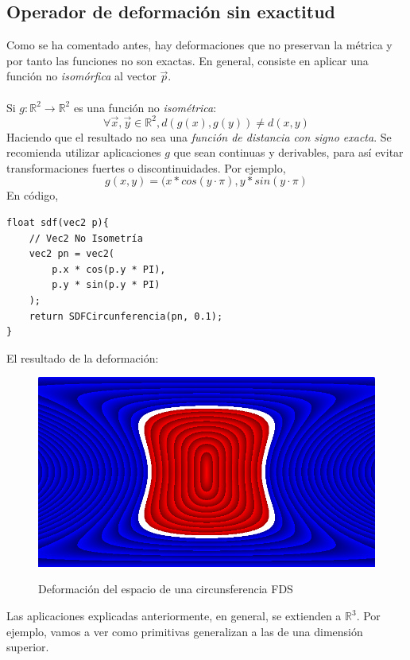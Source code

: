 \subsection{Operador de deformación sin exactitud}
Como se ha comentado antes, hay deformaciones que no preservan la métrica y por tanto las funciones no son exactas. En general, consiste en aplicar una función no \textit{isomórfica} al vector \(\Vec{p}\).\\\\
Si \(g:\mathbb{R}^2\longrightarrow \mathbb{R}^2\) es una función no \textit{isométrica}:
\[ \forall \Vec{x}, \Vec{y} \in \mathbb{R}^2, d(g(x), g(y)) \neq d(x,y) \]
Haciendo que el resultado no sea una \textit{función de distancia con signo exacta}. Se recomienda utilizar aplicaciones \(g\) que sean continuas y derivables, para así evitar transformaciones fuertes o discontinuidades. Por ejemplo,
\[g(x,y)=(x * cos(y \cdot \pi), y * sin(y \cdot \pi)\]
En código,
\begin{lstlisting}
float sdf(vec2 p){
	// Vec2 No Isometría
	vec2 pn = vec2(
	    p.x * cos(p.y * PI),
	    p.y * sin(p.y * PI)
	);
	return SDFCircunferencia(pn, 0.1);
}
\end{lstlisting}
El resultado de la deformación:
\begin{figure}[H]
  \centering
  \captionsetup{justification=centering}%
  \includegraphics[width=1.0\textwidth]{secciones/imagenes/sdf/2d/sdf_deform.png}\label{fig:deform}
  \caption{Deformación del espacio de una circunsferencia FDS}
\end{figure}

Las aplicaciones explicadas anteriormente, en general, se extienden a \(\mathbb{R}^3\). Por ejemplo, vamos a ver como primitivas generalizan a las de una dimensión superior.

